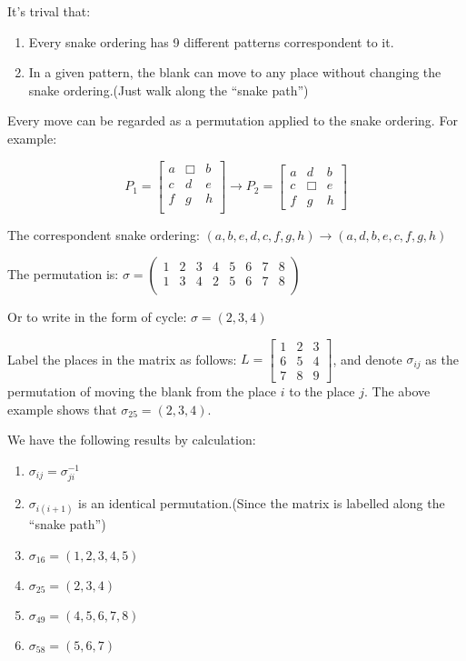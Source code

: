It's trival that:
\begin{enumerate}
    \item Every snake ordering has 9 different patterns correspondent to it.
    \item In a given pattern, the blank can move to any place without changing the snake ordering.(Just walk along the ``snake path'')
\end{enumerate}

Every move can be regarded as a permutation applied to the snake ordering. For example:

\[ P_1 = \begin{bmatrix}a &\Box&b\\c&d&e\\f&g&h\\\end{bmatrix}  \rightarrow P_2 = \begin{bmatrix}a&d&b\\c&\Box&e\\f&g&h\end{bmatrix}\]

The correspondent snake ordering: $ (a,b,e,d,c,f,g,h)\rightarrow (a,d,b,e,c,f,g,h)$

The permutation is: $ \sigma = \begin{pmatrix}1&2&3&4&5&6&7&8\\1&3&4&2&5&6&7&8\\\end{pmatrix}$

Or to write in the form of cycle: $ \sigma = (2,3,4)$
\vspace{3em}

Label the places in the matrix as follows: $ L = \begin{bmatrix}1&2&3\\6&5&4\\7&8&9\end{bmatrix}$, and denote $ \sigma_{ij}$ as the
permutation of moving the blank from the place $ i$ to the place $ j$. The above example shows that $ \sigma_{25} = (2,3,4)$.

We have the following results by calculation:
\begin{enumerate}
    \item $ \sigma_{ij}= \sigma_{ji}^{-1}$
      \item $ \sigma_{i(i+1)}$ is an identical permutation.(Since the matrix is labelled along the ``snake path'')
          \item$  \sigma_{16} = (1,2,3,4,5)$
          \item$  \sigma_{25} = (2,3,4)$
          \item$  \sigma_{49} = (4,5,6,7,8)$
          \item$  \sigma_{58} = (5,6,7)$
\end{enumerate}

